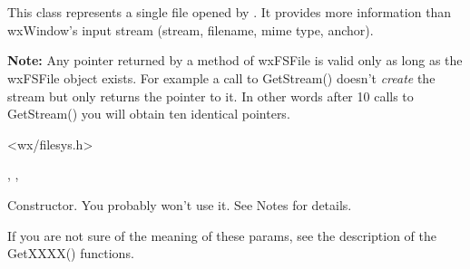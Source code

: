 %
%

\section{}\label{wxfsfile}

This class represents a single file opened by .
It provides more information than wxWindow's input stream 
(stream, filename, mime type, anchor).

{\bf Note:} Any pointer returned by a method of wxFSFile is valid
only as long as the wxFSFile object exists. For example a call to GetStream()
doesn't {\it create} the stream but only returns the pointer to it. In
other words after 10 calls to GetStream() you will obtain ten identical
pointers.




<wx/filesys.h>


, 
, 


\label{wxfsfilewxfsfile}


Constructor. You probably won't use it. See Notes for details.






If you are not sure of the meaning of these params, see the description of the GetXXXX()
functions.

